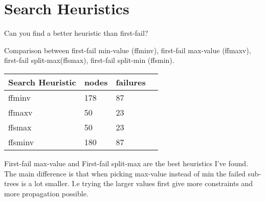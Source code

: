\documentclass[a4paper, 11pt]{article}
\begin{document}
\section{Search Heuristics}
Can you find a better heuristic than first-fail?

Comparison between first-fail min-value (ffminv), first-fail max-value (ffmaxv), first-fail split-max(ffsmax), first-fail split-min (ffsmin).
\begin{center}
  \begin{tabular}{ | l | l | l | p{7cm} |}
    \hline
    \textbf{Search Heuristic} & \textbf{nodes} & \textbf{failures} \\ \hline
    ffminv & 178 & 87 \\\hline
    ffmaxv & 50 & 23 \\\hline
    ffsmax & 50 & 23 \\\hline
    ffsminv & 180 & 87 \\\hline
  \end{tabular}
\end{center}
First-fail max-value and First-fail split-max are the best heuristics I've found. The main difference is that when picking max-value instead of min the failed sub-trees is a lot smaller. I.e trying the larger values first give more constraints and more propagation possible.
\end{document}
